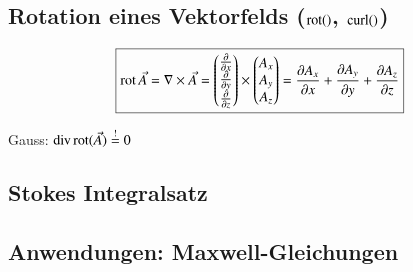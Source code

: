 \subsection[Rotation eines Vektorfelds (rot(), curl())]{Rotation eines Vektorfelds ($\operatorname{rot}()$, $\operatorname{curl}()$)}
\[
    \boxed{%
        \rot \vec{A}
        = \nabla \times \vec{A}
        =   \begin{pmatrix}
                \frac{\partial}{\partial x}\\
                \frac{\partial}{\partial y}\\
                \frac{\partial}{\partial z}
            \end{pmatrix} \times 
        \begin{pmatrix}
            A_x \\ A_y \\ A_z
        \end{pmatrix} =
        \frac{\partial A_x}{\partial x} + \frac{\partial A_y}{\partial y} + \frac{\partial A_z}{\partial z}
    }
\]

Gauss: $\operatorname{div} \operatorname{rot}(\vec{A}) \overset{!}{=} 0$

\subsection{Stokes Integralsatz}


\subsection{Anwendungen: Maxwell-Gleichungen}

